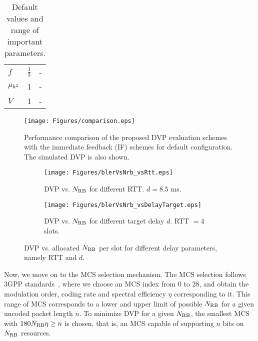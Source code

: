 \begin{table}[t]
\begin{tabular}{|l|l|l|}
$f$                   & $\frac{1}{3}$  & -                                                                                                                                \\
${\mu_{h^2}}$               & 1              & -                                                                                                                                \\
$V$                   & 1              & -                                                                                                                                \\ \hline
\end{tabular}
\caption{Default values and range of important parameters.}
\label{table:params}
\end{table}
\begin{figure}[b]
\centering
\texttt{[image: Figures/comparison.eps]}
\caption{Performance comparison of the proposed DVP evaluation schemes with the immediate feedback (IF) schemes for default configuration. The simulated DVP is also shown.}
\label{fig.Comparison}
\end{figure}
\begin{figure*}[t]
\centering
\begin{subfigure}[t]{0.49\linewidth}
\centering
\texttt{[image: Figures/blerVsNrb\_vsRtt.eps]}
\caption{DVP vs. $N_{\mathrm{RB}}$ for different RTT. $d=8.5$ ms.}
\label{fig:Sim_dvp-nrb-rtt}
\end{subfigure}
\begin{subfigure}[t]{0.49\linewidth}
\centering
\texttt{[image: Figures/blerVsNrb\_vsDelayTarget.eps]}
\caption{DVP vs. $N_{\mathrm{RB}}$ for different target delay $d$. RTT $=4$ slots.}
\label{fig:Sim_dvp-nrb-d}
\end{subfigure}
\caption{DVP vs. allocated $N_{\mathrm{RB}}$ per slot for different delay parameters, namely RTT and $d$.}
\label{fig:Sim_dvp-nrb-nAndRtt}
\end{figure*}

Now, we move on to the MCS selection mechanism. 
The MCS selection follows 3GPP standards~\cite{3gpp.38.214}, where we choose an MCS index from 0 to 28, and obtain the modulation order, coding rate and spectral efficiency $\eta$ corresponding to it.
This range of MCS corresponds to a lower and upper limit of possible $N_{\mathrm{RB}}$ for a given uncoded packet length $n$.
To minimize DVP for a given $N_{\mathrm{RB}}$, the smallest MCS with $180N_{\mathrm{RB}}\eta\geq n$ is chosen, that is, an MCS capable of supporting $n$ bits on $N_{\mathrm{RB}}$ resources. 

